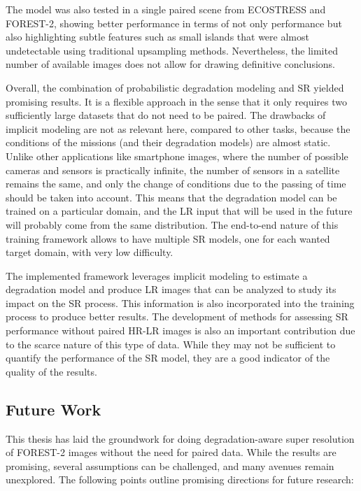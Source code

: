 The model was also tested in a single paired scene from ECOSTRESS and FOREST-2, showing better performance in terms of not only performance but also highlighting subtle features such as small islands that were almost undetectable using traditional upsampling methods. Nevertheless, the limited number of available images does not allow for drawing definitive conclusions.

Overall, the combination of probabilistic degradation modeling and SR yielded promising results. It is a flexible approach in the sense that it only requires two sufficiently large datasets that do not need to be paired. 
The drawbacks of implicit modeling are not as relevant here, compared to other tasks, because the conditions of the missions (and their degradation models) are almost static. Unlike other applications like smartphone images, where the number of possible cameras and sensors is practically infinite, the number of sensors in a satellite remains the same, and only the change of conditions due to the passing of time should be taken into account. This means that the degradation model can be trained on a particular domain, and the LR input that will be used in the future will probably come from the same distribution. The end-to-end nature of this training framework allows to have multiple SR models, one for each wanted target domain, with very low difficulty.

The implemented framework leverages implicit modeling to estimate a degradation model and produce LR images that can be analyzed to study its impact on the SR process. This information is also incorporated into the training process to produce better results.
The development of methods for assessing SR performance without paired HR-LR images is also an important contribution due to the scarce nature of this type of data. While they may not be sufficient to quantify the performance of the SR model, they are a good indicator of the quality of the results.

\subsection{Future Work}

This thesis has laid the groundwork for doing degradation-aware super resolution of FOREST-2 images without the need for paired data. While the results are promising, several assumptions can be challenged, and many avenues remain unexplored. The following points outline promising directions for future research:

